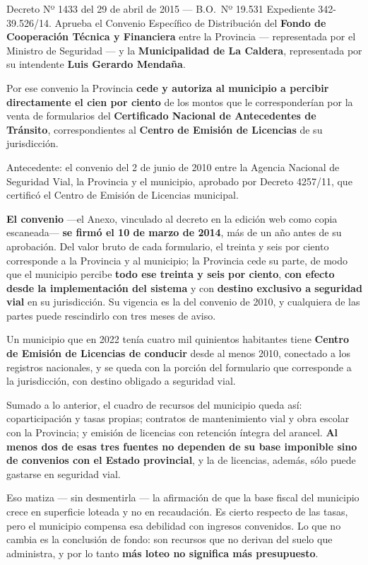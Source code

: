 \begin{ficha}{Decreto Nº 1433 del 29 de abril de 2015 --- B.O.\ Nº 19.531}
Expediente 342-39.526/14. Aprueba el Convenio Específico de Distribución del \textbf{Fondo de Cooperación Técnica y Financiera} entre la Provincia --- representada por el Ministro de Seguridad --- y la \textbf{Municipalidad de La Caldera}, representada por su intendente \textbf{Luis Gerardo Mendaña}.

Por ese convenio la Provincia \textbf{cede y autoriza al municipio a percibir directamente el cien por ciento} de los montos que le corresponderían por la venta de formularios del \textbf{Certificado Nacional de Antecedentes de Tránsito}, correspondientes al \textbf{Centro de Emisión de Licencias} de su jurisdicción.

Antecedente: el convenio del 2 de junio de 2010 entre la Agencia Nacional de Seguridad Vial, la Provincia y el municipio, aprobado por Decreto 4257/11, que certificó el Centro de Emisión de Licencias municipal.

\textbf{El convenio} ---el Anexo, vinculado al decreto en la edición web como copia escaneada--- \textbf{se firmó el 10 de marzo de 2014}, más de un año antes de su aprobación. Del valor bruto de cada formulario, el treinta y seis por ciento corresponde a la Provincia y al municipio; la Provincia cede su parte, de modo que el municipio percibe \textbf{todo ese treinta y seis por ciento}, \textbf{con efecto desde la implementación del sistema} y con \textbf{destino exclusivo a seguridad vial} en su jurisdicción. Su vigencia es la del convenio de 2010, y cualquiera de las partes puede rescindirlo con tres meses de aviso.
\end{ficha}

Un municipio que en 2022 tenía cuatro mil quinientos habitantes tiene \textbf{Centro de Emisión de Licencias de conducir} desde al menos 2010, conectado a los registros nacionales, y se queda con la porción del formulario que corresponde a la jurisdicción, con destino obligado a seguridad vial.

Sumado a lo anterior, el cuadro de recursos del municipio queda así: coparticipación y tasas propias; contratos de mantenimiento vial y obra escolar con la Provincia; y emisión de licencias con retención íntegra del arancel. \textbf{Al menos dos de esas tres fuentes no dependen de su base imponible sino de convenios con el Estado provincial}, y la de licencias, además, sólo puede gastarse en seguridad vial.

Eso matiza --- sin desmentirla --- la afirmación de que la base fiscal del municipio crece en superficie loteada y no en recaudación. Es cierto respecto de las tasas, pero el municipio compensa esa debilidad con ingresos convenidos. Lo que no cambia es la conclusión de fondo: son recursos que no derivan del suelo que administra, y por lo tanto \textbf{más loteo no significa más presupuesto}.


